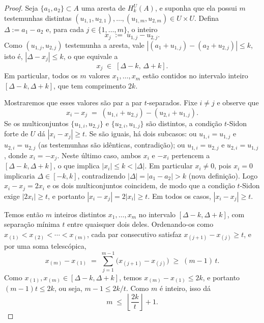 \documentclass[reqno,a4paper,12pt]{amsart}
\begin{document}
\begin{proof}
  Seja $\{a_1,a_2\} \subset A$ uma aresta de $H_k^U(A)$, e suponha que ela possui $m$
  testemunhas distintas $(u_{1,1},u_{2,1}), \ldots, (u_{1,m},u_{2,m}) \in U \times U$.
  Defina $\Delta := a_1 - a_2$ e, para cada $j \in \{1,\ldots,m\}$, o inteiro
  \[
    x_j \;:=\; u_{1,j} - u_{2,j}.
  \]
  Como $(u_{1,j}, u_{2,j})$ testemunha a aresta, vale $|(a_1 + u_{1,j}) - (a_2 + u_{2,j})| \leq k$,
  isto é, $|\Delta - x_j| \leq k$, o que equivale a
  \[
    x_j \;\in\; [\Delta - k,\, \Delta + k].
  \]
  Em particular, todos os $m$ valores $x_1, \ldots, x_m$ estão contidos no intervalo inteiro
  $[\Delta - k, \Delta + k]$, que tem comprimento $2k$.

  Mostraremos que esses valores são par a par $t$-separados. Fixe $i \neq j$ e observe que
  \[
    x_i - x_j \;=\; (u_{1,i} + u_{2,j}) - (u_{2,i} + u_{1,j}).
  \]
  Se os multiconjuntos $\{u_{1,i}, u_{2,j}\}$ e $\{u_{2,i}, u_{1,j}\}$ são distintos, a
  condição $t$-Sidon forte de $U$ dá $|x_i - x_j| \geq t$. Se são iguais, há dois subcasos:
  ou $u_{1,i} = u_{1,j}$ e $u_{2,i} = u_{2,j}$ (as testemunhas são idênticas, contradição);
  ou $u_{1,i} = u_{2,j}$ e $u_{2,i} = u_{1,j}$, donde $x_i = -x_j$. Neste último caso,
  ambos $x_i$ e $-x_i$ pertencem a $[\Delta-k,\Delta+k]$, o que implica $|x_i| \leq k < |\Delta|$.
  Em particular $x_i \neq 0$, pois $x_i = 0$ implicaria $\Delta \in [-k,k]$, contradizendo
  $|\Delta| = |a_1-a_2| > k$ (nova definição). Logo $x_i - x_j = 2x_i$ e os dois multiconjuntos
  coincidem, de modo que a condição $t$-Sidon exige $|2x_i| \geq t$,
  e portanto $|x_i - x_j| = 2|x_i| \geq t$. Em todos os casos, $|x_i - x_j| \geq t$.

  Temos então $m$ inteiros distintos $x_1, \ldots, x_m$ no intervalo $[\Delta-k, \Delta+k]$,
  com separação mínima $t$ entre quaisquer dois deles. Ordenando-os como
  $x_{(1)} < x_{(2)} < \cdots < x_{(m)}$, cada par consecutivo satisfaz
  $x_{(j+1)} - x_{(j)} \geq t$, e por uma soma telescópica,
  \[
    x_{(m)} - x_{(1)}
    \;=\; \sum_{j=1}^{m-1}\bigl(x_{(j+1)} - x_{(j)}\bigr)
    \;\geq\; (m-1)\,t.
  \]
  Como $x_{(1)}, x_{(m)} \in [\Delta-k, \Delta+k]$, temos $x_{(m)} - x_{(1)} \leq 2k$,
  e portanto $(m-1)t \leq 2k$, ou seja, $m - 1 \leq 2k/t$. Como $m$ é inteiro, isso dá
  \[
    m \;\leq\; \left\lfloor \frac{2k}{t} \right\rfloor + 1.
  \]


\end{proof}
\end{document}
